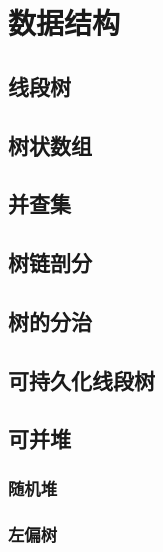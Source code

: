 \documentclass[10pt]{article}
\begin{document}
\tableofcontents
\newpage

\section{数据结构}
\subsection{线段树}

\subsection{树状数组}

\subsection{并查集}

\subsection{树链剖分}


\subsection{树的分治}


\subsection{可持久化线段树}


\subsection{可并堆}

\subsubsection{随机堆}
\subsubsection{左偏树}

\end{document}
